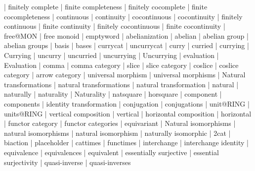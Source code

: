     |   finitely complete
    |   finite completeness
    |   finitely cocomplete
    |   finite cocompleteness
    |   continuous
    |   continuity
    |   cocontinuous
    |   cocontinuity
    |   finitely continuous
    |   finite continuity
    |   finitely cocontinuous
    |   finite cocontinuity
    |   free@MON
    |   free monoid
    |   emptyword
    |   abelianization
    |   abelian
    |   abelian group
    |   abelian groups
    |   basis
    |   bases
    |   currycat
    |   uncurrycat
    |   curry
    |   curried
    |   currying
    |   Currying
    |   uncurry
    |   uncurried
    |   uncurrying
    |   Uncurrying
    |   evaluation
    |   Evaluation
    |   comma
    |   comma category
    |   slice
    |   slice category
    |   coslice
    |   coslice category
    |   arrow category
    |   universal morphism
    |   universal morphisms
    |   Natural transformations
    |   natural transformations
    |   natural transformation
    |   natural
    |   naturally
    |   naturality
    |   Naturality
    |   natsquare
    |   horsquare
    |   component
    |   components
    |   identity transformation
    |   conjugation
    |   conjugations
    |   unit@RING
    |   units@RING
    |   vertical composition
    |   vertical
    |   horizontal composition
    |   horizontal
    |   functor category
    |   functor categories
    |   equivariant
    |   Natural isomorphisms
    |   natural isomorphisms
    |   natural isomorphism
    |   naturally isomorphic
    |   2cat
    |   biaction
    |   placeholder
    |   cattimes
    |   functimes
    |   interchange
    |   interchange identity
    |   equivalence
    |   equivalences
    |   equivalent
    |   essentially surjective
    |   essential surjectivity
    |   quasi-inverse
    |   quasi-inverses
